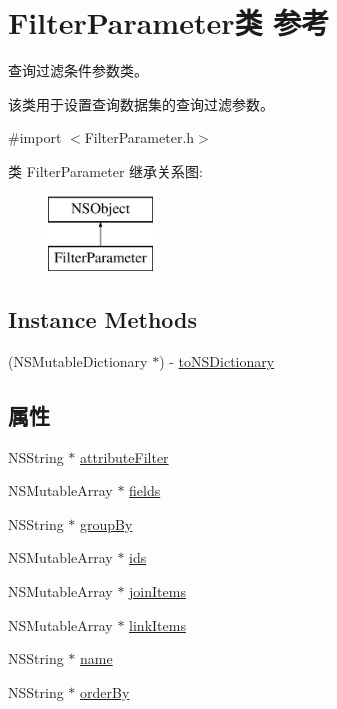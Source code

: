 \hypertarget{interface_filter_parameter}{\section{Filter\-Parameter类 参考}
\label{interface_filter_parameter}
}


查询过滤条件参数类。 \par
 该类用于设置查询数据集的查询过滤参数。  




{\ttfamily \#import $<$Filter\-Parameter.\-h$>$}

类 Filter\-Parameter 继承关系图\-:\begin{figure}[H]
\begin{center}
\leavevmode
\includegraphics[height=2.000000cm]{interface_filter_parameter}
\end{center}
\end{figure}
\subsection*{Instance Methods}
\begin{DoxyCompactItemize}
\item 
(N\-S\-Mutable\-Dictionary $\ast$) -\/ \hyperlink{interface_filter_parameter_aec58bf3889230a6ab7209ce239fb242e}{to\-N\-S\-Dictionary}
\end{DoxyCompactItemize}
\subsection*{属性}
\begin{DoxyCompactItemize}
\item 
N\-S\-String $\ast$ \hyperlink{interface_filter_parameter_a04bd8e83fd0de6e02737efaf0817821e}{attribute\-Filter}
\item 
N\-S\-Mutable\-Array $\ast$ \hyperlink{interface_filter_parameter_ac4806e37406b21dc3f9e09edd94047b9}{fields}
\item 
N\-S\-String $\ast$ \hyperlink{interface_filter_parameter_a4da1063e06d3211179e35fca8a4043f9}{group\-By}
\item 
N\-S\-Mutable\-Array $\ast$ \hyperlink{interface_filter_parameter_ab6ee6c87b71d464fe5cb5308a2f93977}{ids}
\item 
N\-S\-Mutable\-Array $\ast$ \hyperlink{interface_filter_parameter_a63b04dc5f922c4d6a012933331a76149}{join\-Items}
\item 
N\-S\-Mutable\-Array $\ast$ \hyperlink{interface_filter_parameter_aa6ccb9ad285c9ac4c284a03115a834f5}{link\-Items}
\item 
N\-S\-String $\ast$ \hyperlink{interface_filter_parameter_a32495fe4ce8013104c0433f3467ad743}{name}
\item 
N\-S\-String $\ast$ \hyperlink{interface_filter_parameter_a519e07fe4d3de6fef4514cd20c0eea2b}{order\-By}
\end{DoxyCompactItemize}


